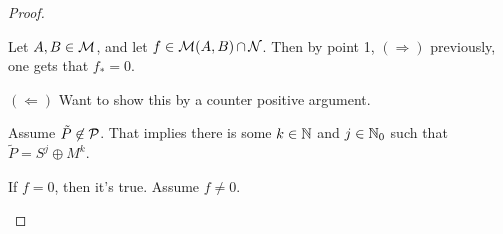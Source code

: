 \begin{proof}
\begin{enumerate}
{            %


            Let \( A, B \in {\mathcal{M}} \), and let \( f \in {\mathcal{M}}(A, B) \mathop{\cap}\limits {\mathcal{N}} \). Then by point 1, \( (\Rightarrow) \) previously, one gets that \( f_* = 0 \).
            
            \( (\Leftarrow) \) Want to show this by a counter positive argument.

            Assume \( \tilde{P} \not\in {\mathcal{P}} \). That implies there is some \( k \in {\mathbb{N}} \) and \( j \in {\mathbb{N}}_0 \) such that \( \tilde{P} = S^j \oplus M^k \).

            If \( f = 0 \), then it's true. Assume \( f \neq 0 \).


        }
    \end{enumerate}
\end{proof}